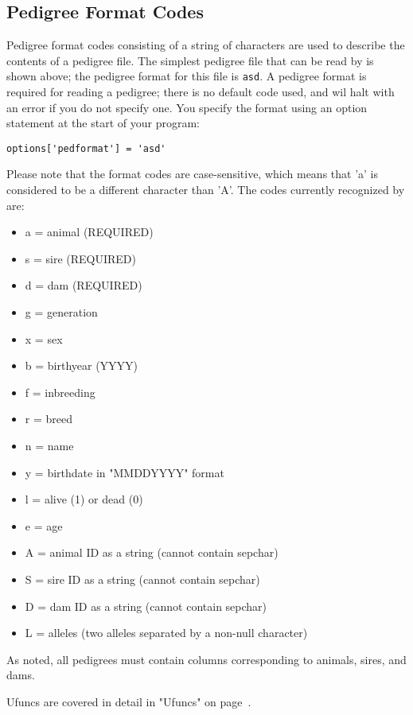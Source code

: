 \subsection{Pedigree Format Codes}
\label{sec:pedigree-format-codes}
Pedigree format codes consisting of a string of characters are used to describe
the contents of a pedigree file.  The simplest pedigree file that can be read by \PyPedal{}
is shown above; the pedigree format for this file is \texttt{asd}.  A pedigree format is required
for reading a pedigree; there is no default code used, and \PyPedal{} wil halt with an error if you
do not specify one.  You specify the format using an option statement at the start of your program:
\begin{verbatim}
options['pedformat'] = 'asd'
\end{verbatim}
Please note that the format codes are case-sensitive, which means that 'a'
is considered to be a different character than 'A'.  The codes currently
recognized by \PyPedal{} are:
\begin{itemize}
\item a = animal (REQUIRED)
\item s = sire (REQUIRED)
\item d = dam (REQUIRED)
\item g = generation
\item x = sex
\item b = birthyear (YYYY)
\item f = inbreeding
\item r = breed
\item n = name
\item y = birthdate in "MMDDYYYY" format
\item l = alive (1) or dead (0)
\item e = age
\item A = animal ID as a string (cannot contain sepchar)
\item S = sire ID as a string (cannot contain sepchar)
\item D = dam ID as a string (cannot contain sepchar)
\item L = alleles (two alleles separated by a non-null character)
\end{itemize}
As noted, all pedigrees must contain columns corresponding to animals, sires, and dams.

Ufuncs are covered in detail in "Ufuncs" on page~\pageref{cha:ufuncs}.